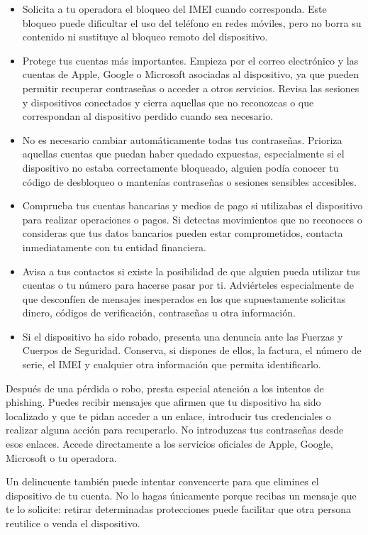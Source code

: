 \documentclass[
  spanish,
  a4paper,
  openany]{book}
\begin{document}
\begin{itemize}
\item
  Solicita a tu operadora el bloqueo del IMEI cuando corresponda. Este bloqueo puede dificultar el uso del teléfono en redes móviles, pero no borra su contenido ni sustituye al bloqueo remoto del dispositivo.
\item
  Protege tus cuentas más importantes. Empieza por el correo electrónico y las cuentas de Apple, Google o Microsoft asociadas al dispositivo, ya que pueden permitir recuperar contraseñas o acceder a otros servicios. Revisa las sesiones y dispositivos conectados y cierra aquellas que no reconozcas o que correspondan al dispositivo perdido cuando sea necesario.
\item
  No es necesario cambiar automáticamente todas tus contraseñas. Prioriza aquellas cuentas que puedan haber quedado expuestas, especialmente si el dispositivo no estaba correctamente bloqueado, alguien podía conocer tu código de desbloqueo o mantenías contraseñas o sesiones sensibles accesibles.
\item
  Comprueba tus cuentas bancarias y medios de pago si utilizabas el dispositivo para realizar operaciones o pagos. Si detectas movimientos que no reconoces o consideras que tus datos bancarios pueden estar comprometidos, contacta inmediatamente con tu entidad financiera.
\item
  Avisa a tus contactos si existe la posibilidad de que alguien pueda utilizar tus cuentas o tu número para hacerse pasar por ti. Adviérteles especialmente de que desconfíen de mensajes inesperados en los que supuestamente solicitas dinero, códigos de verificación, contraseñas u otra información.
\item
  Si el dispositivo ha sido robado, presenta una denuncia ante las Fuerzas y Cuerpos de Seguridad. Conserva, si dispones de ellos, la factura, el número de serie, el IMEI y cualquier otra información que permita identificarlo.
\end{itemize}

Después de una pérdida o robo, presta especial atención a los intentos de phishing. Puedes recibir mensajes que afirmen que tu dispositivo ha sido localizado y que te pidan acceder a un enlace, introducir tus credenciales o realizar alguna acción para recuperarlo. No introduzcas tus contraseñas desde esos enlaces. Accede directamente a los servicios oficiales de Apple, Google, Microsoft o tu operadora.

Un delincuente también puede intentar convencerte para que elimines el dispositivo de tu cuenta. No lo hagas únicamente porque recibas un mensaje que te lo solicite: retirar determinadas protecciones puede facilitar que otra persona reutilice o venda el dispositivo.
\end{document}
